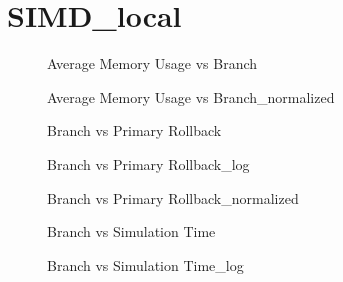 \section{SIMD\_local}
\begin{figure}[H]
\centering

\caption{Average Memory Usage vs Branch}
\end{figure}
\vspace{1cm}
\begin{figure}[H]
\centering

\caption{Average Memory Usage vs Branch\_normalized}
\end{figure}
\vspace{1cm}
\newpage
\begin{figure}[H]
\centering

\caption{Branch vs Primary Rollback}
\end{figure}
\vspace{1cm}
\begin{figure}[H]
\centering

\caption{Branch vs Primary Rollback\_log}
\end{figure}
\vspace{1cm}
\newpage
\begin{figure}[H]
\centering

\caption{Branch vs Primary Rollback\_normalized}
\end{figure}
\vspace{1cm}
\begin{figure}[H]
\centering

\caption{Branch vs Simulation Time}
\end{figure}
\vspace{1cm}
\newpage
\begin{figure}[H]
\centering

\caption{Branch vs Simulation Time\_log}
\end{figure}
